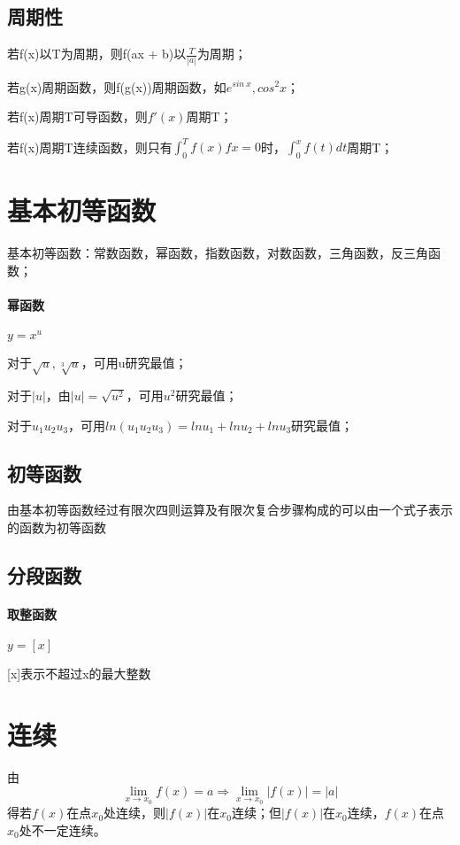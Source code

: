 \subsection{周期性}
若f(x)以T为周期，则f(ax + b)以\(\frac{T}{|a|}\)为周期；

若g(x)周期函数，则f(g(x))周期函数，如\(e^{sin\ x}, cos^2x\)；

若f(x)周期T可导函数，则\(f'(x)\)周期T；

若f(x)周期T连续函数，则只有\(\displaystyle \int_0^Tf(x)fx = 0\)时，\(\displaystyle \int_0^xf(t)dt\)周期T；


\section{基本初等函数}
基本初等函数：常数函数，幂函数，指数函数，对数函数，三角函数，反三角函数；
\paragraph{幂函数}
\(y = x^u\)

对于\(\sqrt{u},\sqrt[3]{u}\)，可用u研究最值；

对于\(|u|\)，由\(|u| = \sqrt{u^2}\)，可用\(u^2\)研究最值；

对于\(u_1u_2u_3\)，可用\(ln(u_1u_2u_3) = lnu_1 + lnu_2 + lnu_3\)研究最值；


\subsection{初等函数}
由基本初等函数经过有限次四则运算及有限次复合步骤构成的可以由一个式子表示的函数为初等函数


\subsection{分段函数}

\paragraph{取整函数}
\(y = [x]\)

[x]表示不超过x的最大整数


\section{连续}

由\[\lim_{x \to x_0}f(x) = a \Rightarrow \lim_{x \to x_0}|f(x)| = |a|\]
得若\(f(x)\)在点\(x_0\)处连续，则\(|f(x)|\)在\(x_0\)连续；但\(|f(x)|\)在\(x_0\)连续，\(f(x)\)在点\(x_0\)处不一定连续。


